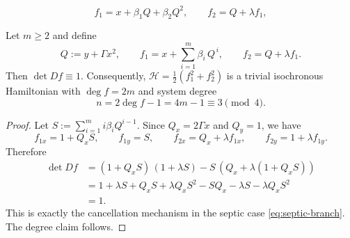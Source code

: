 \documentclass[10pt,a4paper]{amsart}
\begin{document}
\begin{equation}
\label{eq:septic-branch}f_{1}=x+\beta_{1} Q+\beta_{2} Q^{2},\qquad
f_{2}=Q+\lambda f_{1},
\end{equation}

\begin{proposition}
[The $Q$--branch for $n=4m-1$]\label{prop:Q-branch} Let $m\geq2$ and define
\begin{equation}
Q:=y+\Gamma x^{2},\qquad f_{1}=x+\sum_{i=1}^{m}\beta_{i}\,Q^{\,i},\qquad
f_{2}=Q+\lambda f_{1}.\label{eq:Q-branch}%
\end{equation}
Then $\det Df\equiv1$. Consequently, $\mathcal{H}=\tfrac{1}{2}(f_{1}^{2}%
+f_{2}^{2})$ is a trivial isochronous Hamiltonian with $\deg f=2m$ and system
degree
\[
n=2\deg f-1=4m-1\equiv3\pmod 4.
\]

\end{proposition}

\begin{proof}
Let $S:=\sum_{i=1}^m i\beta_i Q^{i-1}$. Since $Q_x=2\Gamma x$ and $Q_y=1$, we have
\begin{equation*}
f_{1x}=1+Q_x S,\qquad f_{1y}=S,\qquad
f_{2x}=Q_x+\lambda f_{1x},\qquad f_{2y}=1+\lambda f_{1y}.
\end{equation*}
Therefore
\begin{align*}
\det Df
&= (1+Q_xS)\,(1+\lambda S)-S\,(Q_x+\lambda(1+Q_xS))\\
&= 1 + \lambda S + Q_x S + \lambda Q_x S^2 - S Q_x - \lambda S - \lambda Q_x S^2\\
&= 1.
\end{align*}
This is exactly the cancellation mechanism in the septic case \eqref{eq:septic-branch}. The degree claim follows.
\end{proof}
\end{document}
